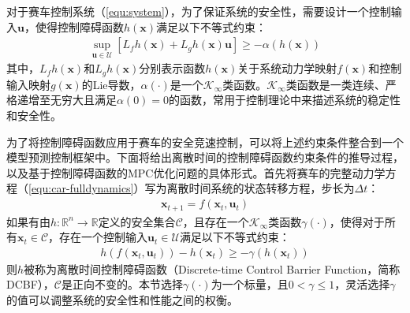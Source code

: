 对于赛车控制系统（\ref{equ:system}），为了保证系统的安全性，需要设计一个控制输入$\boldsymbol{u}$，使得控制障碍函数$h(\boldsymbol{x})$满足以下不等式约束：
\begin{equation}
\begin{aligned}
    \sup_{\boldsymbol{u}\in \mathcal{U}}[L_f h(\boldsymbol{x})+L_g h(\boldsymbol{x})\boldsymbol{u}] \geq -\alpha(h(\boldsymbol{x}))
\end{aligned}
\end{equation}
其中，$L_f h(\boldsymbol{x})$和$L_g h(\boldsymbol{x})$分别表示函数$h(\boldsymbol{x})$关于系统动力学映射$f(\boldsymbol{x})$和控制输入映射$g(\boldsymbol{x})$的Lie导数，$\alpha(\cdot)$是一个$\mathcal{K}_{\infty}$类函数。$\mathcal{K}_{\infty}$类函数是一类连续、严格递增至无穷大且满足$\alpha(0)=0$的函数，常用于控制理论中来描述系统的稳定性和安全性。

为了将控制障碍函数应用于赛车的安全竞速控制，可以将上述约束条件整合到一个模型预测控制框架中。下面将给出离散时间的控制障碍函数约束条件的推导过程，以及基于控制障碍函数的MPC优化问题的具体形式。首先将赛车的完整动力学方程（\ref{equ:car-fulldynamics}）写为离散时间系统的状态转移方程，步长为$\Delta t$：
\begin{equation}
\begin{aligned}
    \boldsymbol{x}_{t+1}=f(\boldsymbol{x}_t,\boldsymbol{u}_t)
\end{aligned}
\end{equation}
如果有由$h:\mathbb{R}^n \rightarrow \mathbb{R}$定义的安全集合$\mathcal{C}$，且存在一个$\mathcal{K}_{\infty}$类函数$\gamma(\cdot)$，使得对于所有$\boldsymbol{x}_t \in\mathcal{C}$，存在一个控制输入$\boldsymbol{u}_t \in \mathcal{U}$满足以下不等式约束：
\begin{equation}
\begin{aligned}
    h(f(\boldsymbol{x}_t,\boldsymbol{u}_t)) - h(\boldsymbol{x}_t) \geq -\gamma(h(\boldsymbol{x}_t))
\end{aligned}
\end{equation}
则$h$被称为离散时间控制障碍函数（Discrete-time Control Barrier Function，简称DCBF），$\mathcal{C}$是正向不变的。本节选择$\gamma(\cdot)$为一个标量，且$0<\gamma\leq 1$，灵活选择$\gamma$的值可以调整系统的安全性和性能之间的权衡。

